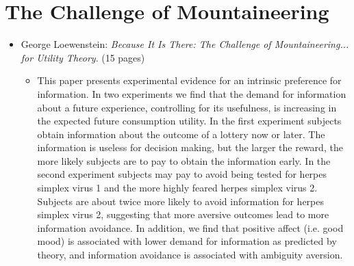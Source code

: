 		
\section{The Challenge of Mountaineering}
\begin{itemize}
	\item George Loewenstein: \textit{Because It Is There: The Challenge of Mountaineering... for Utility Theory}. (15 pages)
		\begin{itemize}
			\item This paper presents experimental evidence for an intrinsic preference for information. In two experiments we find that the demand for information about a future experience, controlling for its usefulness, is increasing in the expected future consumption utility. In the first experiment subjects obtain information about the outcome of a lottery now or later. The information is useless for decision making, but the larger the reward, the more likely subjects are to pay to obtain the information early. In the second experiment subjects may pay to avoid being tested for herpes simplex virus 1 and the more highly feared herpes simplex virus 2. Subjects are about twice more likely to avoid information for herpes simplex virus 2, suggesting that more aversive outcomes lead to more information avoidance. In addition, we find that positive affect (i.e. good mood) is associated with lower demand for information as predicted by theory, and information avoidance is associated with ambiguity aversion.
		\end{itemize}
\end{itemize}


